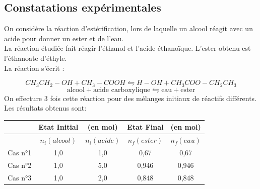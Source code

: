 \subsection*{Constatations expérimentales}
On considère la réaction d'estérification, lors de laquelle un alcool réagit avec un acide pour donner un ester et de l'eau.\\
La réaction étudiée fait réagir l'éthanol et l'acide éthanoïque. L'ester obtenu est l'éthanoate d'éthyle.\\
La réaction s'écrit : 

$$CH_3CH_2-OH + CH_3-COOH\leftrightharpoons H-OH +CH_3COO-CH_2CH_3$$
$$\text{alcool} + \text{acide carboxylique}  \leftrightharpoons \text{eau}  + \text{ester}$$
On effecture 3 fois cette réaction pour des mélanges initiaux de réactifs différents. Les résultats obtenus sont:
\begin{center}
\begin{tabular}{l|cc||cc}
  & Etat Initial & (en mol) & Etat Final& (en mol)\\ \hline
  &$n_i(alcool)$ &$n_i(acide)$ &$n_f(ester)$&$n_f(eau)$\\
  \hline
 Cas n°1 &1,0&1,0&0,67&0,67 \\
 \hline
  Cas n°2 &1,0&5,0&0,946&0,946 \\
  \hline
  Cas n°3 &1,0&2,0&0,848&0,848 
\end{tabular}
\end{center}

